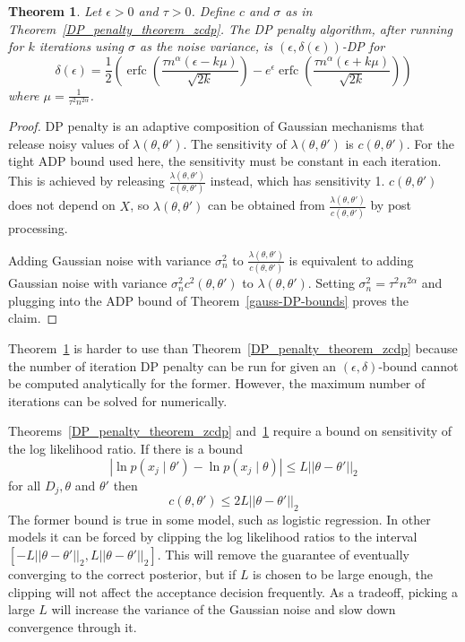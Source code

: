 \documentclass[english,twoside,openright]{HYgraduMLDS}
\newtheorem{theorem}{Theorem}
\DeclareMathOperator{\erfc}{erfc}
\begin{document}
\begin{theorem}\label{DP_penalty_theorem_adp}
    Let \(\epsilon > 0\) and \(\tau > 0\).
    Define \(c\) and \(\sigma\) as in Theorem~\ref{DP_penalty_theorem_zcdp}.
    The DP penalty algorithm, after running for \(k\) iterations using \(\sigma\)
    as the noise variance, 
    is \((\epsilon, \delta(\epsilon))\)-DP for
    \[
        \delta(\epsilon) 
        = \frac{1}{2}\left(
            \erfc\left(\frac{\tau n^\alpha(\epsilon - k\mu)}{\sqrt{2k}}\right)
            - e^\epsilon \erfc\left(\frac{\tau n^\alpha(\epsilon + k\mu)}{\sqrt{2k}}\right)
        \right)
    \]
    where \(\mu = \frac{1}{\tau^2 n^{2\alpha}}\).
\end{theorem}
\begin{proof}
    DP penalty is an adaptive composition of Gaussian mechanisms that release 
    noisy values of \(\lambda(\theta, \theta')\). The sensitivity of 
    \(\lambda(\theta, \theta')\) is 
    \(c(\theta, \theta')\). For the tight ADP bound used here, the sensitivity must be 
    constant in each iteration. This is achieved by releasing 
    \(\frac{\lambda(\theta, \theta')}{c(\theta, \theta')}\) instead, which 
    has sensitivity 1. \(c(\theta, \theta')\) does not depend on \(X\), 
    so \(\lambda(\theta, \theta')\) can be obtained from 
    \(\frac{\lambda(\theta, \theta')}{c(\theta, \theta')}\) by post processing.

    Adding Gaussian noise with variance \(\sigma_n^2\) to 
    \(\frac{\lambda(\theta, \theta')}{c(\theta, \theta')}\)
    is equivalent to adding Gaussian noise with variance 
    \(\sigma_n^2 c^2(\theta, \theta')\) to \(\lambda(\theta, \theta')\).
    Setting \(\sigma_n^2 = \tau^2n^{2\alpha}\) and plugging into 
    the ADP bound of Theorem~\ref{gauss-DP-bounds} proves the 
    claim.
\end{proof}

Theorem~\ref{DP_penalty_theorem_adp} is harder to use than 
Theorem~\ref{DP_penalty_theorem_zcdp} because the number of iteration 
DP penalty can be run for given an \((\epsilon, \delta)\)-bound cannot be 
computed analytically for the former. However, the maximum number of iterations 
can be solved for numerically.

Theorems~\ref{DP_penalty_theorem_zcdp} and~\ref{DP_penalty_theorem_adp}
require a bound on sensitivity of the log likelihood ratio. If there is a bound 
\[
    |\ln p(x_j\mid \theta') - \ln p(x_j\mid \theta)| \leq L||\theta - \theta'||_2
\]
for all \(D_j, \theta\) and \(\theta'\) then 
\[
    c(\theta, \theta') \leq 2L||\theta - \theta'||_2
\]
The former bound is true in some model, such as logistic regression. In other 
models it can be forced by clipping the log likelihood ratios to the interval 
\([-L||\theta - \theta'||_2, L||\theta - \theta'||_2]\). This will remove the 
guarantee of eventually converging to the correct posterior, but if \(L\) is 
chosen to be large enough, the clipping will not affect the 
acceptance decision frequently. As a tradeoff, picking a large \(L\) will increase 
the variance of the Gaussian noise and slow down convergence through it.
\end{document}
